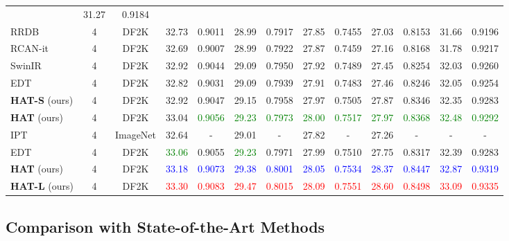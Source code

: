 \documentclass[10pt,twocolumn,letterpaper]{article}
\begin{document}
\begin{table*}[!ht]
\begin{center}
{\begin{tabular}{|l|c|c|c|c|c|c|c|c|c|c|c|c|}
& 31.27 
& 0.9184
\\
RRDB & 4 & DF2K & {32.73}
& {0.9011 }
& {28.99}
& {0.7917}
& {27.85}
& {0.7455}
& {27.03}
& {0.8153}
& {31.66}
& {0.9196}
\\
RCAN-it & 4 & DF2K & 32.69
& 0.9007
& 28.99
& 0.7922
& 27.87
& 0.7459
& 27.16
& 0.8168
& 31.78
& 0.9217
\\
SwinIR & 4 & DF2K & 32.92
& 0.9044
& 29.09
& 0.7950
& 27.92
& 0.7489
& 27.45
& 0.8254
& 32.03
& 0.9260
\\
EDT & 4 & DF2K & 32.82
& 0.9031
& 29.09
& 0.7939
& 27.91
& 0.7483
& 27.46
& 0.8246
& 32.05
& 0.9254
\\
\textbf{HAT-S} (ours) & 4 & DF2K & {32.92}
& {0.9047}
& {29.15}
& {0.7958}
& {27.97}
& {0.7505}
& {27.87}
& {0.8346}
& {32.35}
& {0.9283}
\\
\textbf{HAT} (ours) & 4 & DF2K & {33.04}
& \textcolor{green}{0.9056}
& \textcolor{green}{29.23}
& \textcolor{green}{0.7973}
& \textcolor{green}{28.00}
& \textcolor{green}{0.7517}
& \textcolor{green}{27.97}
& \textcolor{green}{0.8368}
& \textcolor{green}{32.48}
& \textcolor{green}{0.9292}
\\
\hdashline
IPT & 4 & ImageNet & {32.64}
& {-}
& {29.01}
& {-}
& {27.82}
& {-}
& {27.26}
& {-}
& {-}
& {-}
\\
EDT & 4 & DF2K & \textcolor{green}{33.06}
& {0.9055}
& \textcolor{green}{29.23}
& {0.7971}
& {27.99}
& 0.7510
& 27.75
& 0.8317
& 32.39
& 0.9283
\\
\textbf{HAT} (ours) & 4 & DF2K & \textcolor{blue}{33.18}
& \textcolor{blue}{0.9073}
& \textcolor{blue}{29.38}
& \textcolor{blue}{0.8001}
& \textcolor{blue}{28.05}
& \textcolor{blue}{0.7534}
& \textcolor{blue}{28.37}
& \textcolor{blue}{0.8447}
& \textcolor{blue}{32.87}
& \textcolor{blue}{0.9319}
\\
\textbf{HAT-L} (ours) & 4 & DF2K & \textcolor{red}{33.30}
& \textcolor{red}{0.9083}
& \textcolor{red}{29.47}
& \textcolor{red}{0.8015}
& \textcolor{red}{28.09}
& \textcolor{red}{0.7551}
& \textcolor{red}{28.60}
& \textcolor{red}{0.8498}
& \textcolor{red}{33.09}
& \textcolor{red}{0.9335}
\\
\hline             
\end{tabular}
}
\vspace{-0.5cm}
\end{center}
\end{table*}

\subsection{Comparison with State-of-the-Art Methods}
\end{document}
